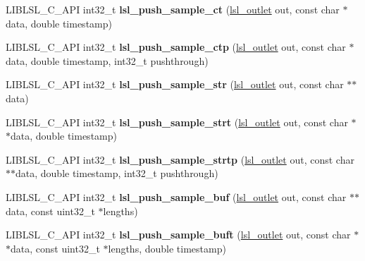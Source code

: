\begin{DoxyCompactItemize}
\item 
\mbox{\label{namespacelsl_a321429ed29e2b8b944f7724361628ba9}} 
L\+I\+B\+L\+S\+L\+\_\+\+C\+\_\+\+A\+PI int32\+\_\+t {\bfseries lsl\+\_\+push\+\_\+sample\+\_\+ct} (\hyperlink{namespacelsl_abcf512b0f66dacf86c10b165995fd50b}{lsl\+\_\+outlet} out, const char $\ast$data, double timestamp)
\item 
\mbox{\label{namespacelsl_a7127acf0d2106d5ae673489510845f58}} 
L\+I\+B\+L\+S\+L\+\_\+\+C\+\_\+\+A\+PI int32\+\_\+t {\bfseries lsl\+\_\+push\+\_\+sample\+\_\+ctp} (\hyperlink{namespacelsl_abcf512b0f66dacf86c10b165995fd50b}{lsl\+\_\+outlet} out, const char $\ast$data, double timestamp, int32\+\_\+t pushthrough)
\item 
\mbox{\label{namespacelsl_a3da2b3303768776977e0d621e2990c0e}} 
L\+I\+B\+L\+S\+L\+\_\+\+C\+\_\+\+A\+PI int32\+\_\+t {\bfseries lsl\+\_\+push\+\_\+sample\+\_\+str} (\hyperlink{namespacelsl_abcf512b0f66dacf86c10b165995fd50b}{lsl\+\_\+outlet} out, const char $\ast$$\ast$data)
\item 
\mbox{\label{namespacelsl_a634f8191b28e9cb9b6edcf01aaead377}} 
L\+I\+B\+L\+S\+L\+\_\+\+C\+\_\+\+A\+PI int32\+\_\+t {\bfseries lsl\+\_\+push\+\_\+sample\+\_\+strt} (\hyperlink{namespacelsl_abcf512b0f66dacf86c10b165995fd50b}{lsl\+\_\+outlet} out, const char $\ast$$\ast$data, double timestamp)
\item 
\mbox{\label{namespacelsl_aeb9537e1d060020c99c47371b07bcb24}} 
L\+I\+B\+L\+S\+L\+\_\+\+C\+\_\+\+A\+PI int32\+\_\+t {\bfseries lsl\+\_\+push\+\_\+sample\+\_\+strtp} (\hyperlink{namespacelsl_abcf512b0f66dacf86c10b165995fd50b}{lsl\+\_\+outlet} out, const char $\ast$$\ast$data, double timestamp, int32\+\_\+t pushthrough)
\item 
\mbox{\label{namespacelsl_a77dbefbfa9fc565f9ead1db3574ef001}} 
L\+I\+B\+L\+S\+L\+\_\+\+C\+\_\+\+A\+PI int32\+\_\+t {\bfseries lsl\+\_\+push\+\_\+sample\+\_\+buf} (\hyperlink{namespacelsl_abcf512b0f66dacf86c10b165995fd50b}{lsl\+\_\+outlet} out, const char $\ast$$\ast$data, const uint32\+\_\+t $\ast$lengths)
\item 
\mbox{\label{namespacelsl_ace903fc8ac868a1afedf98090f5c5b4c}} 
L\+I\+B\+L\+S\+L\+\_\+\+C\+\_\+\+A\+PI int32\+\_\+t {\bfseries lsl\+\_\+push\+\_\+sample\+\_\+buft} (\hyperlink{namespacelsl_abcf512b0f66dacf86c10b165995fd50b}{lsl\+\_\+outlet} out, const char $\ast$$\ast$data, const uint32\+\_\+t $\ast$lengths, double timestamp)
$$
\end{DoxyCompactItemize}
